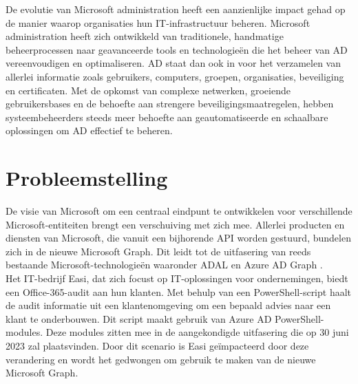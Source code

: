 De evolutie van Microsoft administration heeft een aanzienlijke impact gehad op de manier waarop organisaties hun \ac{IT}-infrastructuur beheren. Microsoft administration heeft zich ontwikkeld van traditionele, handmatige beheerprocessen naar geavanceerde tools en technologieën die het beheer van \Ac{AD} vereenvoudigen en optimaliseren. \ac{AD} staat dan ook in voor het verzamelen van allerlei informatie zoals gebruikers, computers, groepen, organisaties, beveiliging en certificaten. Met de opkomst van complexe netwerken, groeiende gebruikersbases en de behoefte aan strengere beveiligingsmaatregelen, hebben systeembeheerders steeds meer behoefte aan geautomatiseerde en schaalbare oplossingen om \ac{AD} effectief te beheren. \\

\section{Probleemstelling}
\label{sec:probleemstelling}

\begin{comment}
Uit je probleemstelling moet duidelijk zijn dat je onderzoek een meerwaarde heeft voor een concrete doelgroep. De doelgroep moet goed gedefinieerd en afgelijnd zijn. Doelgroepen als ``bedrijven,'' ``KMO's'', systeembeheerders, enz.~zijn nog te vaag. Als je een lijstje kan maken van de personen/organisaties die een meerwaarde zullen vinden in deze bachelorproef (dit is eigenlijk je steekproefkader), dan is dat een indicatie dat de doelgroep goed gedefinieerd is. Dit kan een enkel bedrijf zijn of zelfs één persoon (je co-promotor/opdrachtgever).
\end{comment}

De visie van Microsoft om een centraal eindpunt te ontwikkelen voor verschillende Microsoft-entiteiten brengt een verschuiving met zich mee. Allerlei producten en diensten van Microsoft, die vanuit een bijhorende \ac{API} worden gestuurd, bundelen zich in de nieuwe Microsoft Graph. Dit leidt tot de uitfasering van reeds bestaande Microsoft-technologieën waaronder \ac{ADAL} en Azure \Ac{AD} Graph \autocite{Sahay2022}. \\

Het \ac{IT}-bedrijf Easi, dat zich focust op \ac{IT}-oplossingen voor ondernemingen, biedt een Office-365-audit aan hun klanten. Met behulp van een PowerShell-script haalt de audit informatie uit een klantenomgeving om een bepaald advies naar een klant te onderbouwen. Dit script maakt gebruik van Azure \ac{AD} PowerShell-modules. Deze modules zitten mee in de aangekondigde uitfasering die op 30 juni 2023 zal plaatsvinden. Door dit scenario is Easi geïmpacteerd door deze verandering en wordt het gedwongen om gebruik te maken van de nieuwe Microsoft Graph. \\

